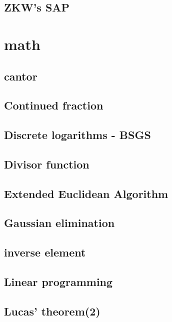 \documentclass[a4paper,5pt,titlepage]{article}
\begin{document}
\subsection{ZKW's SAP}

\section{math}
\subsection{cantor}

\subsection{Continued fraction}

\subsection{Discrete logarithms - BSGS}

\subsection{Divisor function}

\subsection{Extended Euclidean Algorithm}

\subsection{Gaussian elimination}

\subsection{inverse element}

\subsection{Linear programming}

\subsection{Lucas' theorem(2)}

\end{document}
